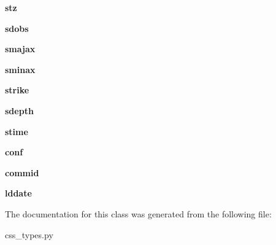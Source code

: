 \begin{DoxyCompactItemize}
\item 
\hypertarget{classcss__types_1_1origerr30_a6722cbd86a9ec1b6c8b4966ea6666187}{}{\bfseries stz}\label{classcss__types_1_1origerr30_a6722cbd86a9ec1b6c8b4966ea6666187}

\item 
\hypertarget{classcss__types_1_1origerr30_af8ae06a323454b5fc3a48212cf210362}{}{\bfseries sdobs}\label{classcss__types_1_1origerr30_af8ae06a323454b5fc3a48212cf210362}

\item 
\hypertarget{classcss__types_1_1origerr30_ae9fd1ecd303596dc5703abdf4ab0bce4}{}{\bfseries smajax}\label{classcss__types_1_1origerr30_ae9fd1ecd303596dc5703abdf4ab0bce4}

\item 
\hypertarget{classcss__types_1_1origerr30_a4c1636e52f93e53095a3a903f98e03ac}{}{\bfseries sminax}\label{classcss__types_1_1origerr30_a4c1636e52f93e53095a3a903f98e03ac}

\item 
\hypertarget{classcss__types_1_1origerr30_acbeaf261025ead86cf26cd1806490d7c}{}{\bfseries strike}\label{classcss__types_1_1origerr30_acbeaf261025ead86cf26cd1806490d7c}

\item 
\hypertarget{classcss__types_1_1origerr30_a0588f286baf93012ba760826087e0e61}{}{\bfseries sdepth}\label{classcss__types_1_1origerr30_a0588f286baf93012ba760826087e0e61}

\item 
\hypertarget{classcss__types_1_1origerr30_a24c29315ca2832f95bb55772e12a9f92}{}{\bfseries stime}\label{classcss__types_1_1origerr30_a24c29315ca2832f95bb55772e12a9f92}

\item 
\hypertarget{classcss__types_1_1origerr30_ac75a396cb04a9ab7584186d332b7a0ce}{}{\bfseries conf}\label{classcss__types_1_1origerr30_ac75a396cb04a9ab7584186d332b7a0ce}

\item 
\hypertarget{classcss__types_1_1origerr30_ab830585d45c32b86efbbca9b684184c3}{}{\bfseries commid}\label{classcss__types_1_1origerr30_ab830585d45c32b86efbbca9b684184c3}

\item 
\hypertarget{classcss__types_1_1origerr30_aa7fe97414c032b33bb6310dee5767e6f}{}{\bfseries lddate}\label{classcss__types_1_1origerr30_aa7fe97414c032b33bb6310dee5767e6f}

\end{DoxyCompactItemize}


The documentation for this class was generated from the following file\+:\begin{DoxyCompactItemize}
\item 
css\+\_\+types.\+py\end{DoxyCompactItemize}
